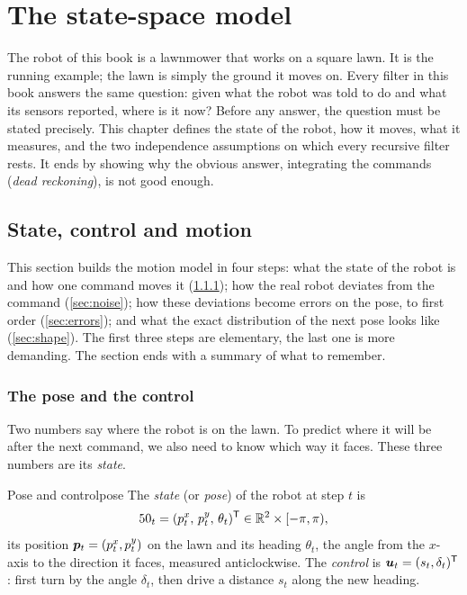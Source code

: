 \chapter{The state-space model}
\label{ch:statespace}

The robot of this book is a lawnmower that works on a square lawn. It is
the running example; the lawn is simply the ground it moves on. Every
filter in this book answers the same question: given what the robot
was told to do and what its sensors reported, where is it now? Before any
answer, the question must be stated precisely. This chapter defines the
state of the robot, how it moves, what it measures, and the two
independence assumptions on which every recursive filter rests. It ends by
showing why the obvious answer, integrating the commands
(\emph{dead reckoning}), is not good enough.

\section{State, control and motion}
\label{sec:motion}

This section builds the motion model in four steps: what the state of the
robot is and how one command moves it (\cref{sec:pose}); how the real
robot deviates from the command (\cref{sec:noise}); how these deviations
become errors on the pose, to first order (\cref{sec:errors}); and what
the exact distribution of the next pose looks like (\cref{sec:shape}).
The first three steps are elementary, the last one is more demanding. The
section ends with a summary of what to remember.

\subsection{The pose and the control}
\label{sec:pose}

Two numbers say where the robot is on the lawn. To predict where it will
be after the next command, we also need to know which way it faces. These
three numbers are its \emph{state}.

\begin{definition}{Pose and control}{pose}
The \emph{state} (or \emph{pose}) of the robot at step $t$ is
\[
  50_t=(p^x_t,\,p^y_t,\,\theta_t)^{\mathsf{T}}\in\mathbb{R}^2\times[-\pi,\pi),
\]
its position $\bm{p}_t=(p^x_t,p^y_t)$ on the lawn and its heading $\theta_t$,
the angle from the $x$-axis to the direction it faces, measured
anticlockwise. The \emph{control} is $\bm{u}_t=(s_t,\delta_t)^{\mathsf{T}}$: first turn
by the angle $\delta_t$, then drive a distance $s_t$ along the new heading.
\end{definition}

